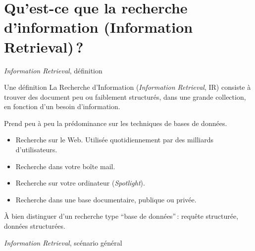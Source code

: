 

\section{Qu'est-ce que la recherche d'information (Information Retrieval)\,?}

\begin{frame}{\textit{Information Retrieval}, définition}

\begin{block}{Une définition}
La \alert{Recherche d'Information} (\textit{Information Retrieval}, IR) consiste à
trouver des \alert{document} peu ou faiblement structurés, dans une grande \alert{collection},
en fonction d'un \alert{besoin d'information}.
\end{block}

Prend peu à peu la prédominance sur les techniques de bases de données.

\begin{itemize} 
  \item Recherche sur le Web. Utilisée quotidiennement par des milliards d'utilisateurs.
   \item Recherche dans votre boîte mail.
   \item Recherche sur votre ordinateur (\textit{Spotlight}).
    \item Recherche dans une base documentaire, publique ou privée.
\end{itemize}

À bien distinguer d'un recherche type ``base de données''\,: requête structurée, données structurées.
\end{frame}

\begin{frame}{\textit{Information Retrieval}, scénario général}



\end{frame}



